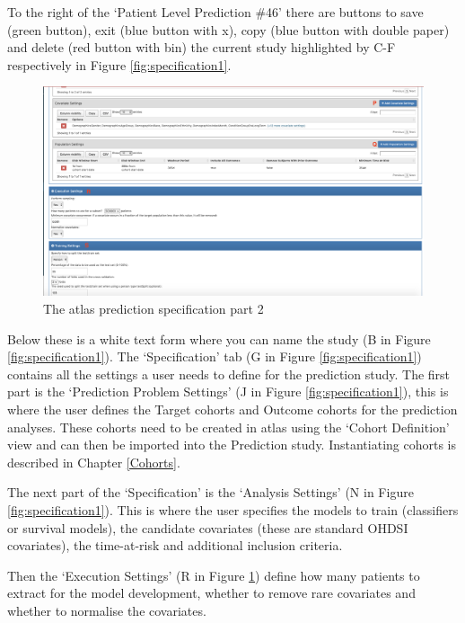 \documentclass[11pt]{book}
\theoremstyle{definition}
\theoremstyle{definition}
\theoremstyle{definition}
\theoremstyle{remark}
\begin{document}
To the right of the `Patient Level Prediction \#46' there are buttons to save (green button), exit (blue button with x), copy (blue button with double paper) and delete (red button with bin) the current study highlighted by C-F respectively in Figure \ref{fig:specification1}.

\begin{figure}
\includegraphics[width=1\linewidth]{images/PatientLevelPrediction/atlasImplementation/specification_p2} \caption{The atlas prediction specification part 2}\label{fig:specification2}
\end{figure}

Below these is a white text form where you can name the study (B in Figure \ref{fig:specification1}). The `Specification' tab (G in Figure \ref{fig:specification1}) contains all the settings a user needs to define for the prediction study. The first part is the `Prediction Problem Settings' (J in Figure \ref{fig:specification1}), this is where the user defines the Target cohorts and Outcome cohorts for the prediction analyses. These cohorts need to be created in atlas using the `Cohort Definition' view and can then be imported into the Prediction study. Instantiating cohorts is described in Chapter \ref{Cohorts}.

The next part of the `Specification' is the `Analysis Settings' (N in Figure \ref{fig:specification1}). This is where the user specifies the models to train (classifiers or survival models), the candidate covariates (these are standard OHDSI covariates), the time-at-risk and additional inclusion criteria.

Then the `Execution Settings' (R in Figure \ref{fig:specification2}) define how many patients to extract for the model development, whether to remove rare covariates and whether to normalise the covariates.
\end{document}
